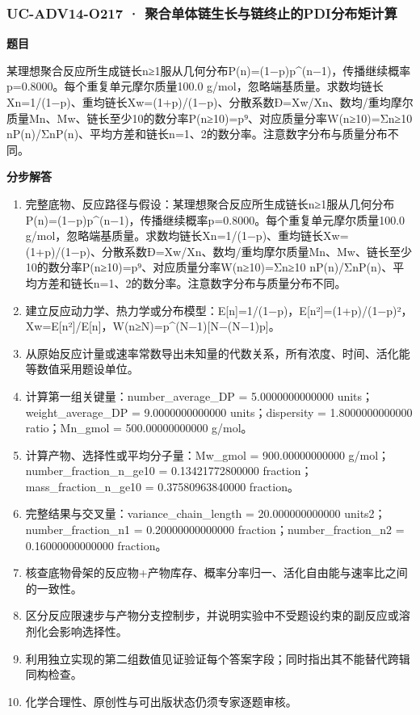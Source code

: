 \documentclass[UTF8,11pt,a4paper]{ctexart}
\begin{document}
\subsubsection*{UC-ADV14-O217 · 聚合单体链生长与链终止的PDI分布矩计算}
\noindent\textbf{题目}\par
某理想聚合反应所生成链长n≥1服从几何分布P(n)=(1−p)p\textasciicircum{}(n−1)，传播继续概率p=0.8000。每个重复单元摩尔质量100.0 g/mol，忽略端基质量。求数均链长Xn=1/(1−p)、重均链长Xw=(1+p)/(1−p)、分散系数Đ=Xw/Xn、数均/重均摩尔质量Mn、Mw、链长至少10的数分率P(n≥10)=p⁹、对应质量分率W(n≥10)=Σn≥10 nP(n)/ΣnP(n)、平均方差和链长n=1、2的数分率。注意数字分布与质量分布不同。\par
\medskip\noindent\textbf{分步解答}
\begin{enumerate}
\item 完整底物、反应路径与假设：某理想聚合反应所生成链长n≥1服从几何分布P(n)=(1−p)p\textasciicircum{}(n−1)，传播继续概率p=0.8000。每个重复单元摩尔质量100.0 g/mol，忽略端基质量。求数均链长Xn=1/(1−p)、重均链长Xw=(1+p)/(1−p)、分散系数Đ=Xw/Xn、数均/重均摩尔质量Mn、Mw、链长至少10的数分率P(n≥10)=p⁹、对应质量分率W(n≥10)=Σn≥10 nP(n)/ΣnP(n)、平均方差和链长n=1、2的数分率。注意数字分布与质量分布不同。
\item 建立反应动力学、热力学或分布模型：E[n]=1/(1−p)，E[n²]=(1+p)/(1−p)²，Xw=E[n²]/E[n]，W(n≥N)=p\textasciicircum{}(N−1)[N−(N−1)p]。
\item 从原始反应计量或速率常数导出未知量的代数关系，所有浓度、时间、活化能等数值采用题设单位。
\item 计算第一组关键量：number\_average\_DP = 5.0000000000000 units；weight\_average\_DP = 9.0000000000000 units；dispersity = 1.8000000000000 ratio；Mn\_gmol = 500.00000000000 g/mol。
\item 计算产物、选择性或平均分子量：Mw\_gmol = 900.00000000000 g/mol；number\_fraction\_n\_ge10 = 0.13421772800000 fraction；mass\_fraction\_n\_ge10 = 0.37580963840000 fraction。
\item 完整结果与交叉量：variance\_chain\_length = 20.000000000000 units2；number\_fraction\_n1 = 0.20000000000000 fraction；number\_fraction\_n2 = 0.16000000000000 fraction。
\item 核查底物骨架的反应物+产物库存、概率分率归一、活化自由能与速率比之间的一致性。
\item 区分反应限速步与产物分支控制步，并说明实验中不受题设约束的副反应或溶剂化会影响选择性。
\item 利用独立实现的第二组数值见证验证每个答案字段；同时指出其不能替代跨辑同构检查。
\item 化学合理性、原创性与可出版状态仍须专家逐题审核。
\end{enumerate}
\end{document}
